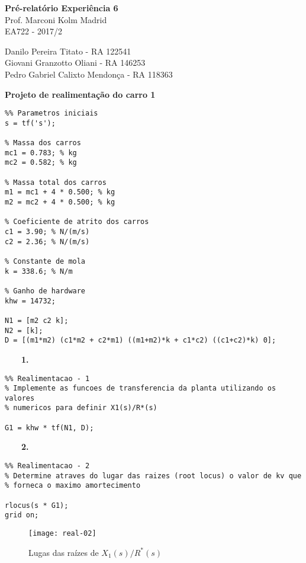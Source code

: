 \documentclass[a4paper,11pt]{article}
\begin{document}
	

\begin{center}
\textbf{Pré-relatório Experiência 6} \\
\hspace{5pt}
Prof. Marconi Kolm Madrid \\
EA722 - 2017/2
\end{center}

\begin{center}
Danilo Pereira Titato - RA 122541 \\
Giovani Granzotto Oliani - RA 146253 \\
Pedro Gabriel Calixto Mendonça - RA 118363
\end{center}

\textbf{Projeto de realimentação do carro 1}

\begin{lstlisting}
%% Parametros iniciais
s = tf('s');

% Massa dos carros
mc1 = 0.783; % kg
mc2 = 0.582; % kg

% Massa total dos carros
m1 = mc1 + 4 * 0.500; % kg
m2 = mc2 + 4 * 0.500; % kg

% Coeficiente de atrito dos carros
c1 = 3.90; % N/(m/s)
c2 = 2.36; % N/(m/s)

% Constante de mola
k = 338.6; % N/m

% Ganho de hardware
khw = 14732;

N1 = [m2 c2 k];
N2 = [k];
D = [(m1*m2) (c1*m2 + c2*m1) ((m1+m2)*k + c1*c2) ((c1+c2)*k) 0];
\end{lstlisting}

~~~~\textbf{1.}

\begin{lstlisting}
%% Realimentacao - 1
% Implemente as funcoes de transferencia da planta utilizando os valores
% numericos para definir X1(s)/R*(s)

G1 = khw * tf(N1, D);
\end{lstlisting}

~~~~\textbf{2.}

\begin{lstlisting}
%% Realimentacao - 2
% Determine atraves do lugar das raizes (root locus) o valor de kv que
% forneca o maximo amortecimento

rlocus(s * G1);
grid on;
\end{lstlisting}

\begin{figure}[H]
\centering
\texttt{[image: real-02]}
\caption{Lugas das raízes de $X_1\left(s\right)/R^\ast\left(s\right)$}
\end{figure}
\end{document}
